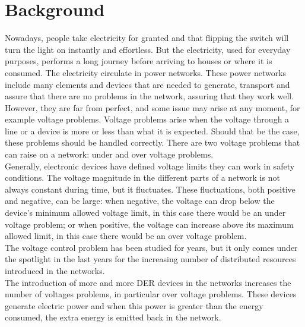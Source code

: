 \chapter{Background}


Nowadays, people take electricity for granted and that flipping the switch will turn the light on instantly and effortless. But the electricity, used for everyday purposes, performs a long journey before arriving to houses or where it is consumed. The electricity circulate in power networks. These power networks include many elements and devices that are needed to generate, transport and assure that there are no problems in the network, assuring that they work well. \\
However, they are far from perfect, and some issue may arise at any moment, for example voltage problems. Voltage problems arise when the voltage through a line or a device is more or less than what it is expected. Should that be the case, these problems should be handled correctly. There are two voltage problems that can raise on a network: under and over voltage problems.\\

Generally, electronic devices have defined voltage limits they can work in safety conditions. The voltage magnitude in the different parts of a network is not always constant during time, but it fluctuates. These fluctuations, both positive and negative, can be large: when negative, the voltage can drop below the device's minimum allowed voltage limit, in this case there would be an under voltage problem; or when positive, the voltage can increase above its maximum allowed limit, in this case there would be an over voltage problem. \\

The voltage control problem has been studied for years, but it only comes under the spotlight in the last years for the increasing number of distributed resources introduced in the networks. \\
The introduction of more and more \gls{DER} devices in the networks increases the number of voltages problems, in particular over voltage problems. These devices generate electric power and when this power is greater than the energy consumed, the extra energy is emitted back in the network.\\ %

